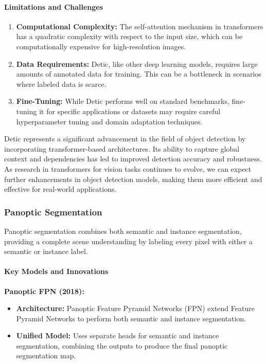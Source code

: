 \documentclass[12pt]{article}
\begin{document}
\paragraph{Limitations and Challenges}
\begin{enumerate}
    \item \textbf{Computational Complexity:} The self-attention mechanism in transformers has a quadratic complexity with respect to the input size, which can be computationally expensive for high-resolution images.
    \item \textbf{Data Requirements:} Detic, like other deep learning models, requires large amounts of annotated data for training. This can be a bottleneck in scenarios where labeled data is scarce.
    \item \textbf{Fine-Tuning:} While Detic performs well on standard benchmarks, fine-tuning it for specific applications or datasets may require careful hyperparameter tuning and domain adaptation techniques.
\end{enumerate}

Detic represents a significant advancement in the field of object detection by incorporating transformer-based architectures. Its ability to capture global context and dependencies has led to improved detection accuracy and robustness. As research in transformers for vision tasks continues to evolve, we can expect further enhancements in object detection models, making them more efficient and effective for real-world applications.


\subsubsection{Panoptic Segmentation}

Panoptic segmentation combines both semantic and instance segmentation, providing a complete scene understanding by labeling every pixel with either a semantic or instance label.

\paragraph{Key Models and Innovations}

\textbf{Panoptic FPN (2018):}
\begin{itemize}
    \item \textbf{Architecture:} Panoptic Feature Pyramid Networks (FPN) extend Feature Pyramid Networks to perform both semantic and instance segmentation.
    \item \textbf{Unified Model:} Uses separate heads for semantic and instance segmentation, combining the outputs to produce the final panoptic segmentation map.
\end{itemize}
\end{document}

